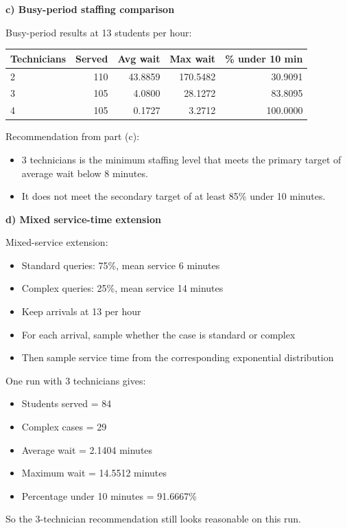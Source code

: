 \documentclass[11pt,a4paper]{article}
\begin{document}
\textbf{c) Busy-period staffing comparison}

Busy-period results at 13 students per hour:

\begin{center}
\begin{tabular}{lrrrr}
\toprule
Technicians & Served & Avg wait & Max wait & \% under 10 min \\
\midrule
2 & 110 & 43.8859 & 170.5482 & 30.9091 \\
3 & 105 & 4.0800 & 28.1272 & 83.8095 \\
4 & 105 & 0.1727 & 3.2712 & 100.0000 \\
\bottomrule
\end{tabular}
\end{center}

Recommendation from part (c):
\begin{itemize}
\item 3 technicians is the minimum staffing level that meets the primary target of average wait below 8 minutes.
\item It does not meet the secondary target of at least 85\% under 10 minutes.
\end{itemize}

\textbf{d) Mixed service-time extension}

Mixed-service extension:
\begin{itemize}
\item Standard queries: 75\%, mean service 6 minutes
\item Complex queries: 25\%, mean service 14 minutes
\item Keep arrivals at 13 per hour
\item For each arrival, sample whether the case is standard or complex
\item Then sample service time from the corresponding exponential distribution
\end{itemize}

One run with 3 technicians gives:
\begin{itemize}
\item Students served = 84
\item Complex cases = 29
\item Average wait = 2.1404 minutes
\item Maximum wait = 14.5512 minutes
\item Percentage under 10 minutes = 91.6667\%
\end{itemize}

So the 3-technician recommendation still looks reasonable on this run.
\end{document}
